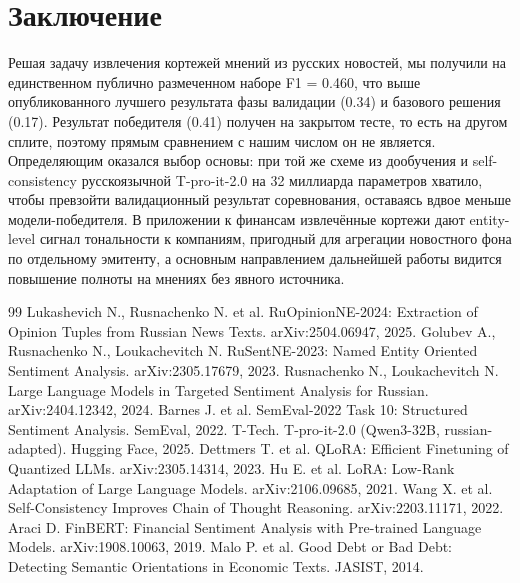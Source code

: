 \documentclass[11pt]{article}
\begin{document}
\section{Заключение}
Решая задачу извлечения кортежей мнений из русских новостей, мы получили на единственном публично размеченном
наборе F1 = 0.460, что выше опубликованного лучшего результата фазы валидации (0.34) и базового решения (0.17).
Результат победителя (0.41) получен на закрытом тесте, то есть на другом сплите, поэтому прямым сравнением с нашим
числом он не является. Определяющим оказался выбор основы: при той же схеме из дообучения и self-consistency
русскоязычной T-pro-it-2.0 на 32 миллиарда параметров хватило, чтобы превзойти валидационный результат соревнования,
оставаясь вдвое меньше модели-победителя. В приложении к финансам извлечённые кортежи дают
entity-level сигнал тональности к компаниям, пригодный для агрегации новостного фона по отдельному эмитенту, а
основным направлением дальнейшей работы видится повышение полноты на мнениях без явного источника.

\begin{thebibliography}{99}
 Lukashevich N., Rusnachenko N. et al. RuOpinionNE-2024: Extraction of Opinion Tuples from Russian News Texts. arXiv:2504.06947, 2025.
 Golubev A., Rusnachenko N., Loukachevitch N. RuSentNE-2023: Named Entity Oriented Sentiment Analysis. arXiv:2305.17679, 2023.
 Rusnachenko N., Loukachevitch N. Large Language Models in Targeted Sentiment Analysis for Russian. arXiv:2404.12342, 2024.
 Barnes J. et al. SemEval-2022 Task 10: Structured Sentiment Analysis. SemEval, 2022.
 T-Tech. T-pro-it-2.0 (Qwen3-32B, russian-adapted). Hugging Face, 2025.
 Dettmers T. et al. QLoRA: Efficient Finetuning of Quantized LLMs. arXiv:2305.14314, 2023.
 Hu E. et al. LoRA: Low-Rank Adaptation of Large Language Models. arXiv:2106.09685, 2021.
 Wang X. et al. Self-Consistency Improves Chain of Thought Reasoning. arXiv:2203.11171, 2022.
 Araci D. FinBERT: Financial Sentiment Analysis with Pre-trained Language Models. arXiv:1908.10063, 2019.
 Malo P. et al. Good Debt or Bad Debt: Detecting Semantic Orientations in Economic Texts. JASIST, 2014.
\end{thebibliography}
\end{document}
